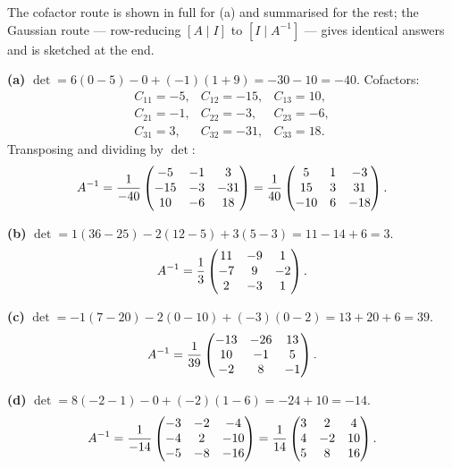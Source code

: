 \begin{solution}
The cofactor route is shown in full for (a) and summarised for the rest; the
Gaussian route --- row-reducing $[A\mid I]$ to $[I\mid A^{-1}]$ --- gives
identical answers and is sketched at the end.

\medskip
\textbf{(a)} $\det=6(0-5)-0+(-1)(1+9)=-30-10=-40$.
Cofactors:
\[
\begin{array}{lll}
C_{11}=-5, & C_{12}=-15, & C_{13}=10,\\
C_{21}=-1, & C_{22}=-3,  & C_{23}=-6,\\
C_{31}=3,  & C_{32}=-31, & C_{33}=18 .
\end{array}
\]
Transposing and dividing by $\det$:
\[
A^{-1}=\frac{1}{-40}\begin{pmatrix}-5&-1&3\\-15&-3&-31\\10&-6&18\end{pmatrix}
=\frac{1}{40}\begin{pmatrix}5&1&-3\\15&3&31\\-10&6&-18\end{pmatrix}.
\]

\medskip
\textbf{(b)} $\det=1(36-25)-2(12-5)+3(5-3)=11-14+6=3$.
\[
A^{-1}=\frac13\begin{pmatrix}11&-9&1\\-7&9&-2\\2&-3&1\end{pmatrix}.
\]

\medskip
\textbf{(c)} $\det=-1(7-20)-2(0-10)+(-3)(0-2)=13+20+6=39$.
\[
A^{-1}=\frac{1}{39}\begin{pmatrix}-13&-26&13\\10&-1&5\\-2&8&-1\end{pmatrix}.
\]

\medskip
\textbf{(d)} $\det=8(-2-1)-0+(-2)(1-6)=-24+10=-14$.
\[
A^{-1}=\frac{1}{-14}\begin{pmatrix}-3&-2&-4\\-4&2&-10\\-5&-8&-16\end{pmatrix}
=\frac{1}{14}\begin{pmatrix}3&2&4\\4&-2&10\\5&8&16\end{pmatrix}.
\]


\end{solution}
